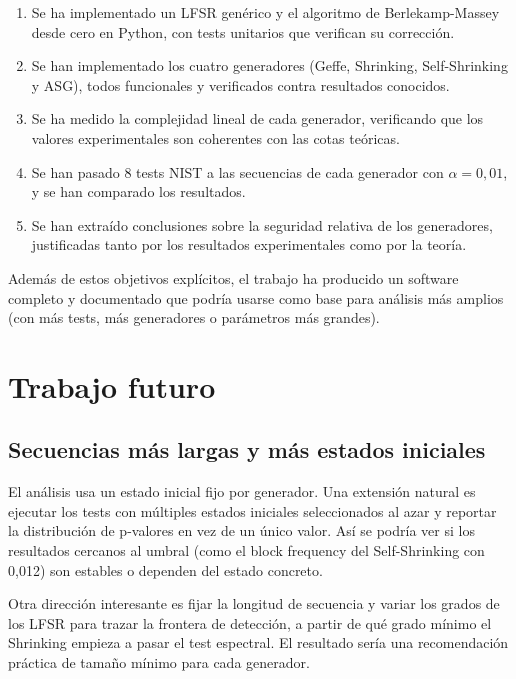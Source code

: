 \begin{enumerate}
  \item Se ha implementado un LFSR genérico y el algoritmo de Berlekamp-Massey desde cero en Python,
        con tests unitarios que verifican su corrección.
  \item Se han implementado los cuatro generadores (Geffe, Shrinking, Self-Shrinking y ASG),
        todos funcionales y verificados contra resultados conocidos.
  \item Se ha medido la complejidad lineal de cada generador,
        verificando que los valores experimentales son coherentes con las cotas teóricas.
  \item Se han pasado 8 tests NIST a las secuencias de cada generador con $\alpha = 0{,}01$,
        y se han comparado los resultados.
  \item Se han extraído conclusiones sobre la seguridad relativa de los generadores,
        justificadas tanto por los resultados experimentales como por la teoría.
\end{enumerate}

Además de estos objetivos explícitos, el trabajo ha producido un software completo y documentado que podría usarse como base para análisis más amplios
(con más tests, más generadores o parámetros más grandes).

\section{Trabajo futuro}

\subsection{Secuencias más largas y más estados iniciales}

El análisis usa un estado inicial fijo por generador. Una extensión natural es ejecutar los tests con múltiples estados iniciales seleccionados al azar
y reportar la distribución de p-valores en vez de un único valor.
Así se podría ver si los resultados cercanos al umbral (como el block frequency del Self-Shrinking con 0,012) son estables o dependen del estado concreto.

Otra dirección interesante es fijar la longitud de secuencia y variar los grados de los LFSR para trazar la frontera de detección,
a partir de qué grado mínimo el Shrinking empieza a pasar el test espectral.
El resultado sería una recomendación práctica de tamaño mínimo para cada generador.

